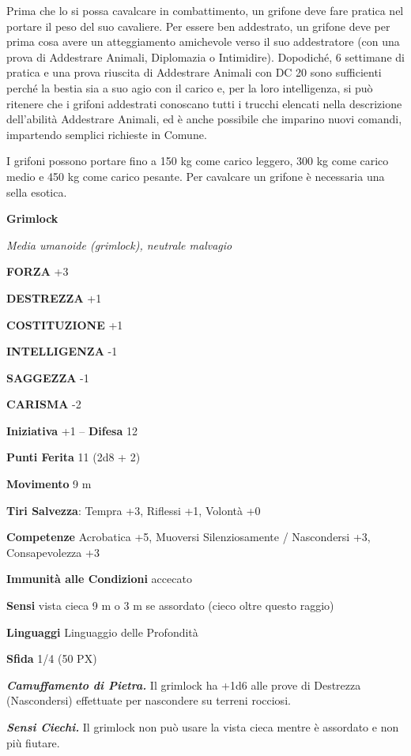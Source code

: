 \begin{multicols}{2}
	Prima che lo si possa cavalcare in combattimento, un grifone deve fare pratica nel portare il peso del suo cavaliere. Per essere ben addestrato, un grifone deve per prima cosa avere un atteggiamento amichevole verso il suo addestratore (con una prova di Addestrare Animali, Diplomazia o Intimidire). Dopodiché, 6 settimane di pratica e una prova riuscita di Addestrare Animali con DC 20 sono sufficienti perché la bestia sia a suo agio con il carico e, per la loro intelligenza, si può ritenere che i grifoni addestrati conoscano tutti i trucchi elencati nella descrizione dell'abilità Addestrare Animali, ed è anche possibile che imparino nuovi comandi, impartendo semplici richieste in Comune.

	I grifoni possono portare fino a 150 kg come carico leggero, 300 kg come carico medio e 450 kg come carico pesante. Per cavalcare un grifone è necessaria una sella esotica.


	\medskip{}\textbf{Grimlock}

	\textit{Media umanoide (grimlock), neutrale malvagio}

	\textbf{FORZA} +3

	\textbf{DESTREZZA} +1

	\textbf{COSTITUZIONE} +1

	\textbf{INTELLIGENZA} -1

	\textbf{SAGGEZZA} -1

	\textbf{CARISMA} -2

	\textbf{Iniziativa} +1 -- \textbf{Difesa} 12

	\textbf{Punti Ferita} 11 (2d8 + 2)

	\textbf{Movimento} 9 m

	\textbf{Tiri Salvezza}: Tempra +3, Riflessi +1, Volontà +0

	\textbf{Competenze} Acrobatica +5, Muoversi Silenziosamente / Nascondersi +3, Consapevolezza +3

	\textbf{Immunità alle Condizioni} accecato

	\textbf{Sensi} vista cieca 9 m o 3 m se assordato (cieco oltre questo raggio)

	\textbf{Linguaggi} Linguaggio delle Profondità

	\textbf{Sfida} 1/4 (50 PX)

	\textit{\textbf{Camuffamento di Pietra.}} Il grimlock ha +1d6 alle prove di Destrezza (Nascondersi) effettuate per nascondere su terreni rocciosi.

	\textit{\textbf{Sensi Ciechi.}} Il grimlock non può usare la vista cieca mentre è assordato e non più fiutare.


\end{multicols}
